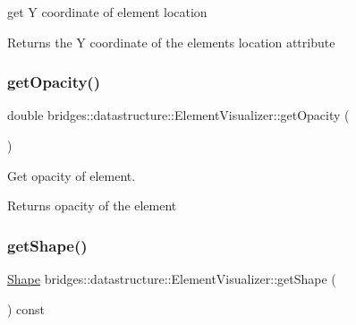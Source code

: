 get Y coordinate of element location 

\begin{DoxyReturn}{Returns}
the Y coordinate of the element\textquotesingle{}s location attribute 
\end{DoxyReturn}
\mbox{\label{classbridges_1_1datastructure_1_1_element_visualizer_af403e841efd1dab3669fdda2fd927f99}} 
\subsubsection{\texorpdfstring{get\+Opacity()}{getOpacity()}}
{\footnotesize\ttfamily double bridges\+::datastructure\+::\+Element\+Visualizer\+::get\+Opacity (\begin{DoxyParamCaption}{ }\end{DoxyParamCaption})\hspace{0.3cm}{\ttfamily [inline]}}



Get opacity of element. 

\begin{DoxyReturn}{Returns}
opacity of the element 
\end{DoxyReturn}
\mbox{\label{classbridges_1_1datastructure_1_1_element_visualizer_a3b1dd1d61f43844142adce1f0bd03dcf}} 
\subsubsection{\texorpdfstring{get\+Shape()}{getShape()}}
{\footnotesize\ttfamily \hyperlink{namespacebridges_1_1datastructure_a3408f5f44d9c6062e5f3adb7e1bbb7f0}{Shape} bridges\+::datastructure\+::\+Element\+Visualizer\+::get\+Shape (\begin{DoxyParamCaption}{ }\end{DoxyParamCaption}) const\hspace{0.3cm}{\ttfamily [inline]}}




